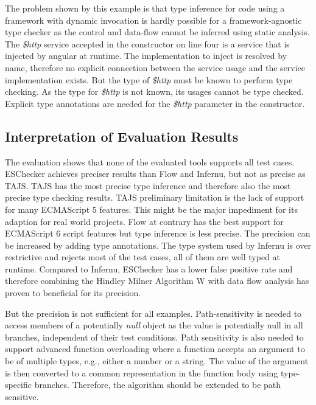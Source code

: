 
The problem shown by this example is that type inference for code using a framework with dynamic invocation is  hardly possible for a framework-agnostic type checker as the control and data-flow cannot be inferred using static analysis. The \textit{\$http} service accepted in the constructor on line four is a service that is injected by angular at runtime. The implementation to inject is resolved by name, therefore no explicit connection between the service usage and the service implementation exists. But the type of \textit{\$http} must be known to perform type checking. As the type for \textit{\$http} is not known, its usages cannot be type checked. Explicit type annotations are needed for the \textit{\$http} parameter in the constructor. 

\subsection{Interpretation of Evaluation Results}
The evaluation shows that none of the evaluated tools supports all test cases. ESChecker achieves preciser results than Flow and Infernu, but not as precise as TAJS. TAJS has the most precise type inference and therefore also the most precise type checking results. TAJS preliminary limitation is the lack of support for many ECMAScript 5 features. This might be the major impediment for its adaption for real world projects. Flow at contrary has the best support for ECMAScript 6 script features but type inference is less precise. The precision can be increased by adding type annotations. The type system used by Infernu is over restrictive and rejects most of the test cases, all of them are well typed at runtime. Compared to Infernu, ESChecker has a lower false positive rate and therefore combining the Hindley Milner Algorithm W with data flow analysis has proven to beneficial for its precision. 

But the precision is not sufficient for all examples. Path-sensitivity is needed to access members of a potentially \textit{null} object as the value is potentially null in all branches, independent of their test conditions. Path sensitivity is also needed to support advanced function overloading where a function accepts an argument to be of multiple types, e.g., either a number or a string. The value of the argument is then converted to a common representation in the function body using type-specific branches. Therefore, the algorithm should be extended to be path sensitive.

